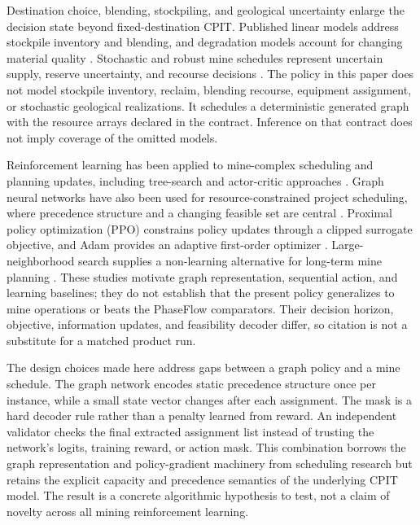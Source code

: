 \documentclass[11pt]{article}
\begin{document}
Destination choice, blending, stockpiling, and geological uncertainty enlarge the decision state beyond fixed-destination CPIT. Published linear models address stockpile inventory and blending, and degradation models account for changing material quality \cite{moreno2017,rezakhah2020blend,rezakhah2020degrade}. Stochastic and robust mine schedules represent uncertain supply, reserve uncertainty, and recourse decisions \cite{ramazan2013,goodfellow2016,lamghari2012,lamghari2016}. The policy in this paper does not model stockpile inventory, reclaim, blending recourse, equipment assignment, or stochastic geological realizations. It schedules a deterministic generated graph with the resource arrays declared in the contract. Inference on that contract does not imply coverage of the omitted models.

Reinforcement learning has been applied to mine-complex scheduling and planning updates, including tree-search and actor-critic approaches \cite{kumar2021,carvalho2023}. Graph neural networks have also been used for resource-constrained project scheduling, where precedence structure and a changing feasible set are central \cite{teichteil2023,zhao2022}. Proximal policy optimization (PPO) constrains policy updates through a clipped surrogate objective, and Adam provides an adaptive first-order optimizer \cite{schulman2017,kingma}. Large-neighborhood search supplies a non-learning alternative for long-term mine planning \cite{blom}. These studies motivate graph representation, sequential action, and learning baselines; they do not establish that the present policy generalizes to mine operations or beats the PhaseFlow comparators. Their decision horizon, objective, information updates, and feasibility decoder differ, so citation is not a substitute for a matched product run.

The design choices made here address gaps between a graph policy and a mine schedule. The graph network encodes static precedence structure once per instance, while a small state vector changes after each assignment. The mask is a hard decoder rule rather than a penalty learned from reward. An independent validator checks the final extracted assignment list instead of trusting the network's logits, training reward, or action mask. This combination borrows the graph representation and policy-gradient machinery from scheduling research but retains the explicit capacity and precedence semantics of the underlying CPIT model. The result is a concrete algorithmic hypothesis to test, not a claim of novelty across all mining reinforcement learning.
\end{document}
